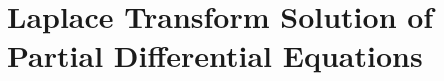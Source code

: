 \chapter{Laplace Transform Solution of Partial Differential Equations}
\label{ch:laplace-pde}









